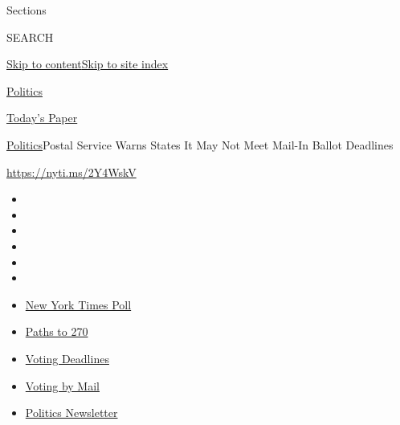 Sections

SEARCH

\protect\hyperlink{site-content}{Skip to
content}\protect\hyperlink{site-index}{Skip to site index}

\href{https://www.nytimes3xbfgragh.onion/section/politics}{Politics}

\href{https://myaccount.nytimes3xbfgragh.onion/auth/login?response_type=cookie\&client_id=vi}{}

\href{https://www.nytimes3xbfgragh.onion/section/todayspaper}{Today's
Paper}

\href{/section/politics}{Politics}\textbar{}Postal Service Warns States
It May Not Meet Mail-In Ballot Deadlines

\url{https://nyti.ms/2Y4WskV}

\begin{itemize}
\item
\item
\item
\item
\item
\item
\end{itemize}

\begin{itemize}
\item
  \href{https://www.nytimes3xbfgragh.onion/2020/09/12/us/politics/biden-trump-poll-wisconsin-minnesota.html?action=click\&pgtype=Article\&state=default\&region=TOP_BANNER\&context=storylines_menu}{New
  York Times Poll}
\item
  \href{https://www.nytimes3xbfgragh.onion/interactive/2020/us/elections/election-states-biden-trump.html?action=click\&pgtype=Article\&state=default\&region=TOP_BANNER\&context=storylines_menu}{Paths
  to 270}
\item
  \href{https://www.nytimes3xbfgragh.onion/interactive/2019/us/elections/2020-presidential-election-calendar.html?action=click\&pgtype=Article\&state=default\&region=TOP_BANNER\&context=storylines_menu}{Voting
  Deadlines}
\item
  \href{https://www.nytimes3xbfgragh.onion/interactive/2020/08/31/us/politics/vote-by-mail-deadlines.html?action=click\&pgtype=Article\&state=default\&region=TOP_BANNER\&context=storylines_menu}{Voting
  by Mail}
\item
  \href{https://www.nytimes3xbfgragh.onion/newsletters/politics?action=click\&pgtype=Article\&state=default\&region=TOP_BANNER\&context=storylines_menu}{Politics
  Newsletter}
\end{itemize}

